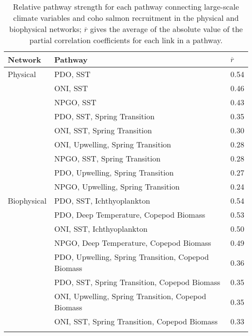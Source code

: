 {\small
\begin{longtable}{lll}
\caption[Relative pathway strength for each pathway connecting large-scale
         climate variables and coho salmon recruitment.]{Relative pathway strength for each pathway connecting large-scale
         climate variables and coho salmon recruitment in the physical and
         biophysical networks; $\overline{r}$ gives the average of the absolute
         value of the partial correlation coefficients for each link in a
         pathway.} \\ 
  \hline
Network & Pathway & $\overline{r}$ \\ 
  \hline
Physical & PDO, SST  & 0.54 \\ 
   & ONI, SST  & 0.46 \\ 
   & NPGO, SST  & 0.43 \\ 
   & PDO, SST, Spring Transition  & 0.35 \\ 
   & ONI, SST, Spring Transition  & 0.30 \\ 
   & ONI, Upwelling, Spring Transition  & 0.28 \\ 
   & NPGO, SST, Spring Transition  & 0.28 \\ 
   & PDO, Upwelling, Spring Transition  & 0.27 \\ 
   & NPGO, Upwelling, Spring Transition  & 0.24 \\ 
  Biophysical & PDO, SST, Ichthyoplankton  & 0.54 \\ 
   & PDO, Deep Temperature, Copepod Biomass  & 0.53 \\ 
   & ONI, SST, Ichthyoplankton  & 0.50 \\ 
   & NPGO, Deep Temperature, Copepod Biomass  & 0.49 \\ 
   & PDO, Upwelling, Spring Transition, Copepod Biomass  & 0.36 \\ 
   & PDO, SST, Spring Transition, Copepod Biomass  & 0.35 \\ 
   & ONI, Upwelling, Spring Transition, Copepod Biomass  & 0.35 \\ 
   & ONI, SST, Spring Transition, Copepod Biomass  & 0.33 \\ 
  \hline
\label{tab:bn:2}
\end{longtable}
}
